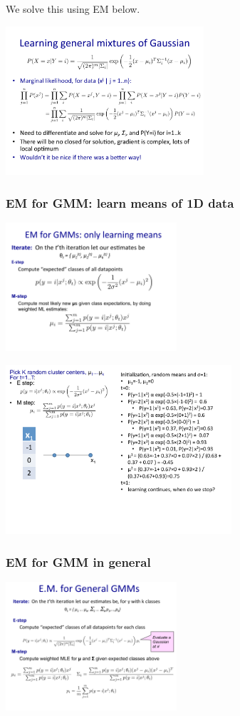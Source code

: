 We solve this using EM below. 

\includegraphics[width=2.9in]{figures/learning_general_mixtures_of_Gaussians.pdf}

\subsubsection{EM for GMM: learn means of 1D data}
\includegraphics[width=2.5in]{figures/gmm--means_only-1.pdf}

\includegraphics[width=3.3in]{figures/gmm--means_only-2.pdf}

\subsubsection{EM for GMM in general}

\includegraphics[width=2.5in]{figures/EM_for_GMM.pdf}

